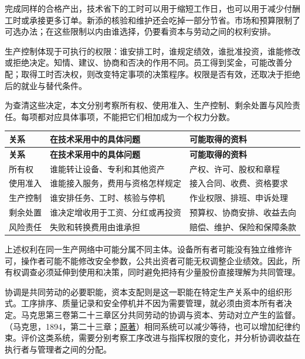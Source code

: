 \documentclass[UTF8,fontset=windows,12pt,a4paper,oneside,openany]{ctexbook}
\begin{document}
完成同样的合格产出，技术省下的工时可以用于缩短工作日，也可以用于减少付酬工时或承接更多订单。新添的核验和维护还会吃掉一部分节省。市场和预算限制了可选办法；在这些限制以内由谁选择，仍要看资本与劳动之间的权利安排。

生产控制体现于可执行的权限：谁安排工时，谁规定绩效，谁批准投资，谁能修改或拒绝决定。知情、建议、协商和否决的作用不同。员工得到奖金，可能改善分配；取得工时否决权，则改变特定事项的决策程序。权限是否有效，还取决于拒绝后的就业与替代条件。

为查清这些决定，本文分别考察所有权、使用准入、生产控制、剩余处置与风险责任。每项都对应具体事项，不能把它们相加成为一个权力分数。

\begingroup\footnotesize\setlength{\tabcolsep}{4pt}\renewcommand{\arraystretch}{1.25}
\begin{longtable}{>{\raggedright\arraybackslash}p{}>{\raggedright\arraybackslash}p{}>{\raggedright\arraybackslash}p{}}
\toprule
\textbf{关系} & \textbf{在技术采用中的具体问题} & \textbf{可能取得的资料} \\
\midrule\endfirsthead
\toprule
\textbf{关系} & \textbf{在技术采用中的具体问题} & \textbf{可能取得的资料} \\
\midrule\endhead
\bottomrule\endfoot
所有权 & 谁能转让设备、专利和其他资产 & 产权、许可、股权和章程 \\
使用准入 & 谁能接入服务，费用与资格怎样规定 & 接入合同、收费、资格要求 \\
生产控制 & 谁安排任务、工时、核验与停机 & 作业权限、排班、申诉处理 \\
剩余处置 & 谁决定增收用于工资、分红或再投资 & 预算权、协商安排、收益去向 \\
风险责任 & 失败和转换费用由谁承担 & 赔偿、维护、保险和保障条款 \\
\end{longtable}\endgroup


上述权利在同一生产网络中可能分属不同主体。设备所有者可能没有独立维修许可，操作者可能不能修改安全参数，公共出资者可能无权调整企业绩效。因此，所有权调查必须延伸到使用和决策，同时避免把持有少量股份直接理解为共同管理。

协调是共同劳动的必要职能，资本支配则是这一职能在特定生产关系中的组织形式。工序排序、质量记录和安全停机并不因为需要管理，就必须由资本所有者决定。马克思第三卷第二十三章区分共同劳动的协调与资本、劳动对立产生的监督。（马克思，1894，第二十三章；\href{https://www.marxists.org/archive/marx/works/1894-c3/ch23.htm}{原著}）相同系统可以减少等待，也可以增加纪律约束。评价这类系统，需要分别考察工序改进与指挥权限的变化，并分析协调收益在执行者与管理者之间的分配。
\end{document}
